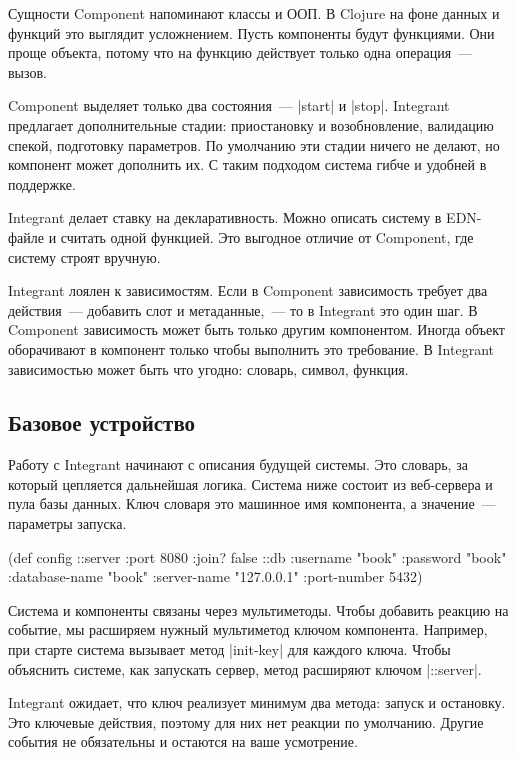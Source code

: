 Сущности Component напоминают классы и ООП. В Clojure на фоне данных и функций
это выглядит усложнением. Пусть компоненты будут функциями. Они проще объекта,
потому что на функцию действует только одна операция~--- вызов.

Component выделяет только два состояния~--- \spverb|start| и
\spverb|stop|. Integrant предлагает дополнительные стадии: приостановку и
возобновление, валидацию спекой, подготовку параметров. По умолчанию эти стадии
ничего не делают, но компонент может дополнить их. С таким подходом система
гибче и удобней в поддержке.

Integrant делает ставку на декларативность. Можно описать систему в EDN-файле и
считать одной функцией. Это выгодное отличие от Component, где систему строят
вручную.

Integrant лоялен к зависимостям. Если в Component зависимость требует два
действия~--- добавить слот и метаданные,~--- то в Integrant это один шаг. В
Component зависимость может быть только другим компонентом. Иногда объект
оборачивают в компонент только чтобы выполнить это требование. В Integrant
зависимостью может быть что угодно: словарь, символ, функция.

\subsection{Базовое устройство}

Работу с Integrant начинают с описания будущей системы. Это словарь, за который
цепляется дальнейшая логика. Система ниже состоит из веб-сервера и пула базы
данных. Ключ словаря это машинное имя компонента, а значение~--- параметры
запуска.

\begin{english}
  \begin{clojure}
(def config
  {::server {:port 8080 :join? false}
   ::db {:username      "book"
         :password      "book"
         :database-name "book"
         :server-name   "127.0.0.1"
         :port-number   5432}})
  \end{clojure}
\end{english}

Система и компоненты связаны через мультиметоды. Чтобы добавить реакцию на
событие, мы расширяем нужный мультиметод ключом компонента. Например, при старте
система вызывает метод \spverb|init-key| для каждого ключа. Чтобы объяснить
системе, как запускать сервер, метод расширяют ключом \spverb|::server|.

Integrant ожидает, что ключ реализует минимум два метода: запуск и
остановку. Это ключевые действия, поэтому для них нет реакции по
умолчанию. Другие события не обязательны и остаются на ваше усмотрение.

